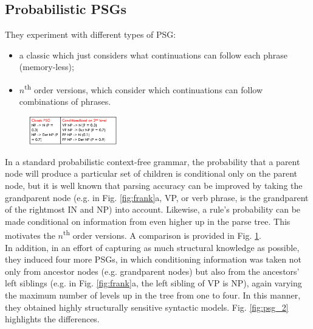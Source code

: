 \subsection{Probabilistic PSGs}
They experiment with different types of PSG:
\begin{itemize}
    \item a classic which just considers what continuations can follow each phrase (memory-less);
\end{itemize}

\begin{itemize}
    \item $n$\textsuperscript{th} order versions, which consider which continuations can follow combinations of phrases.
\end{itemize}

\begin{figure}
  \centering
  \includegraphics[width=0.34\textwidth]{images/psg.png}
  \caption{}
  \label{fig:psg}
\end{figure}

In a standard probabilistic context-free grammar, the probability that a parent node will produce a particular set of children is conditional only on the parent node, but it is well known that parsing accuracy can be improved by taking the grandparent node (e.g. in Fig. \ref{fig:frank}a, VP, or verb phrase, is the grandparent of the rightmost IN and NP) into account. Likewise, a rule's probability can be made conditional on information from even higher up in the parse tree. This motivates the $n$\textsuperscript{th} order versions. A comparison is provided in Fig. \ref{fig:psg}.\\

In addition, in an effort of capturing as much structural knowledge as possible, they induced four more PSGs, in which conditioning information was taken not only from ancestor nodes (e.g. grandparent nodes) but also from the ancestors' left siblings (e.g. in Fig. \ref{fig:frank}a, the left sibling of VP is NP), again varying the maximum number of levels up in the tree from one to four. In this manner, they obtained highly structurally sensitive syntactic models. Fig. \ref{fig:psg_2} highlights the differences.

